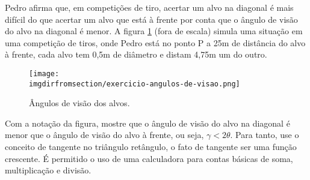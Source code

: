 \begin{exercise}
  Pedro afirma que, em competições de tiro, acertar um alvo na diagonal é mais difícil do que acertar um alvo que está à frente por conta que o ângulo de visão do alvo na diagonal é menor. A figura \ref{fig:angulos-de-visao} (fora de escala) simula uma situação em uma competição de tiros, onde Pedro está no ponto P a 25m de distância do alvo à frente, cada alvo tem 0,5m de diâmetro e distam 4,75m um do outro.
        \begin{figure}[H]
          \centering 
          \texttt{[image: \\imgdirfromsection/exercicio-angulos-de-visao.png]} 
          \caption{Ângulos de visão dos alvos.}
          \label{fig:angulos-de-visao}
        \end{figure}
        Com a notação da figura, mostre que o ângulo de visão do alvo na diagonal é menor que o ângulo de visão do alvo à frente, ou seja, $\gamma < 2\theta$. Para tanto, use o conceito de tangente no triângulo retângulo, o fato de tangente ser uma função crescente. É permitido o uso de uma calculadora para contas básicas de soma, multiplicação e divisão.
\end{exercise}

